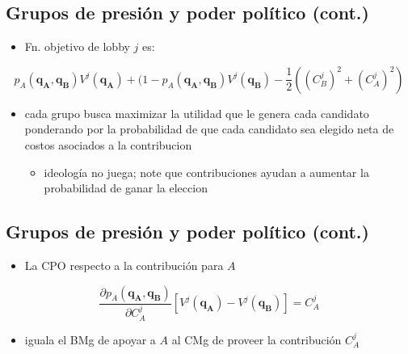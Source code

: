 \documentclass[
  letterpaper,
  DIV=11,
  numbers=noendperiod]{scrartcl}
\providecommand{\tightlist}{%
  \setlength{\itemsep}{0pt}\setlength{\parskip}{0pt}}\usepackage{longtable,booktabs,array}
\begin{document}
\subsection{Grupos de presión y poder político
(cont.)}\label{grupos-de-presiuxf3n-y-poder-poluxedtico-cont.-4}

\begin{itemize}
\tightlist
\item
  Fn. objetivo de lobby \(j\) es:
\end{itemize}

\begin{equation}
p_{A}(\mathbf{q_{A}},\mathbf{q_{B}})V^{j}(\mathbf{q_{A}})+(1-p_{A}(\mathbf{q_{A}},\mathbf{q_{B}})V^{j}(\mathbf{q_{B}})-\frac{1}{2}\left((C^{j}_{B})^{2}+(C^{j}_{A})^{2}\right)
\end{equation}

\begin{itemize}
\tightlist
\item
  cada grupo busca maximizar la utilidad que le genera cada candidato
  ponderando por la probabilidad de que cada candidato sea elegido neta
  de costos asociados a la contribucion

  \begin{itemize}
  \tightlist
  \item
    ideología no juega; note que contribuciones ayudan a aumentar la
    probabilidad de ganar la eleccion
  \end{itemize}
\end{itemize}

\subsection{Grupos de presión y poder político
(cont.)}\label{grupos-de-presiuxf3n-y-poder-poluxedtico-cont.-5}

\begin{itemize}
\tightlist
\item
  La CPO respecto a la contribución para \(A\)
\end{itemize}

\begin{equation}
\frac{\partial{p_{A}}(\mathbf{q_{A}},\mathbf{q_{B}})}{\partial{C^{j}_{A}}}\left[V^{j}(\mathbf{q_{A}})-V^{j}(\mathbf{q_{B}})\right]=C^{j}_{A}
\end{equation}

\begin{itemize}
\tightlist
\item
  iguala el BMg de apoyar a \(A\) al CMg de proveer la contribución
  \(C^{j}_{A}\)
\end{itemize}
\end{document}
